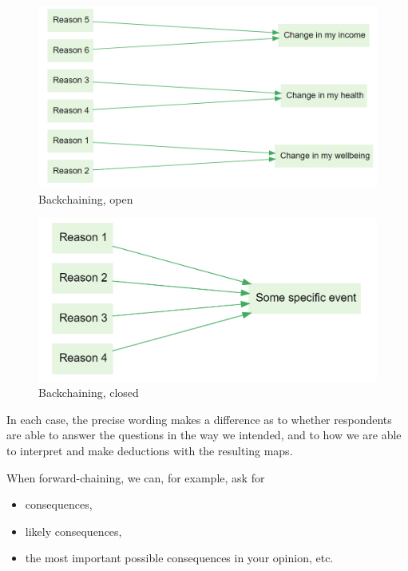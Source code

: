 \documentclass[
]{book}
\providecommand{\tightlist}{%
  \setlength{\itemsep}{0pt}\setlength{\parskip}{0pt}}
\begin{document}
\begin{figure}
\centering
\includegraphics[width=6.77083in,height=\textheight]{_assets/image-20210215085948227.png}
\caption{Backchaining, open}
\end{figure}

\begin{figure}
\centering
\includegraphics[width=6.77083in,height=\textheight]{_assets/image-20210215090049648.png}
\caption{Backchaining, closed}
\end{figure}

In each case, the precise wording makes a difference as to whether respondents are able to answer the questions in the way we intended, and to how we are able to interpret and make deductions with the resulting maps.

When forward-chaining, we can, for example, ask for

\begin{itemize}
\tightlist
\item
  consequences,
\item
  likely consequences,
\item
  the most important possible consequences in your opinion, etc.
\end{itemize}
\end{document}
